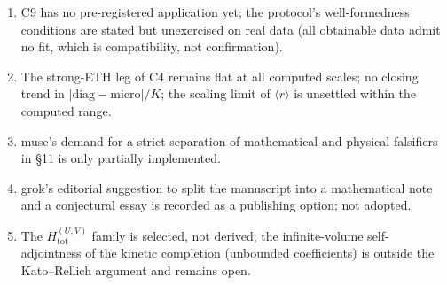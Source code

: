 \documentclass[11pt,a4paper]{article}
\begin{document}
\begin{enumerate}[leftmargin=1.6em]
\item C9 has no pre-registered application yet; the protocol's well-formedness
conditions are stated but unexercised on real data (all obtainable data admit
no fit, which is compatibility, not confirmation).
\item The strong-ETH leg of C4 remains flat at all computed scales; no
closing trend in $|\mathrm{diag}-\mathrm{micro}|/K$; the scaling limit of
$\langle r\rangle$ is unsettled within the computed range.
\item muse's demand for a strict separation of mathematical and physical
falsifiers in \S11 is only partially implemented.
\item grok's editorial suggestion to split the manuscript into a mathematical
note and a conjectural essay is recorded as a publishing option; not adopted.
\item The $H_{\mathrm{tot}}^{(U,V)}$ family is selected, not derived; the
infinite-volume self-adjointness of the kinetic completion (unbounded
coefficients) is outside the Kato--Rellich argument and remains open.
\end{enumerate}
\end{document}

